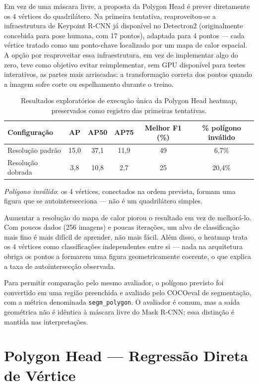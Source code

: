 \documentclass[11pt]{article}
\begin{document}
Em vez de uma máscara livre, a proposta da Polygon Head é prever diretamente os 4
vértices do quadrilátero. Na primeira tentativa, reaproveitou-se a infraestrutura
de Keypoint R-CNN já disponível no Detectron2 (originalmente concebida para pose
humana, com 17 pontos), adaptada para 4 pontos --- cada vértice tratado como um
ponto-chave localizado por um mapa de calor espacial. A opção por reaproveitar essa
infraestrutura, em vez de implementar algo do zero, teve como objetivo evitar
reimplementar, sem GPU disponível para testes interativos, as partes mais
arriscadas: a transformação correta dos pontos quando a imagem sofre corte ou
espelhamento durante o treino.

\begin{table}[H]
\centering
\caption{Resultados exploratórios de execução única da Polygon Head heatmap,
preservados como registro das primeiras tentativas.}
\begin{tabular}{lccccc}
\toprule
Configuração & AP & AP50 & AP75 & Melhor F1 (\%) & \% polígono inválido \\
\midrule
Resolução padrão & 15,0 & 37,1 & 11,9 & 49 & 6,7\% \\
Resolução dobrada & 3,8 & 10,8 & 2,7 & 25 & 20,4\% \\
\bottomrule
\end{tabular}
\end{table}

\noindent \textit{Polígono inválido}: os 4 vértices, conectados na ordem prevista,
formam uma figura que se autointersecciona --- não é um quadrilátero simples.

Aumentar a resolução do mapa de calor piorou o resultado em vez de melhorá-lo. Com
poucos dados (256 imagens) e poucas iterações, um alvo de classificação mais fino
é mais difícil de aprender, não mais fácil. Além disso, o heatmap trata os 4
vértices como classificações independentes entre si --- nada na arquitetura obriga
os pontos a formarem uma figura geometricamente coerente, o que explica a taxa de
autointersecção observada.

Para permitir comparação pelo mesmo avaliador, o polígono previsto foi convertido
em uma região preenchida e avaliado pelo COCOeval de segmentação, com a métrica
denominada \texttt{segm\_polygon}. O avaliador é comum, mas a saída geométrica não
é idêntica à máscara livre do Mask R-CNN; essa distinção é mantida nas
interpretações.

\section{Polygon Head --- Regressão Direta de Vértice}
\end{document}
